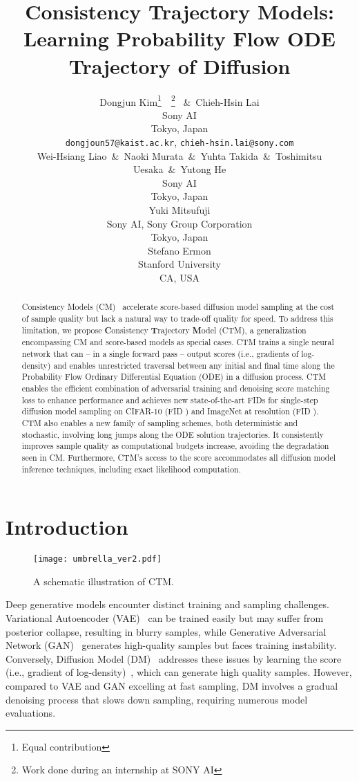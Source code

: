 \documentclass{article} \usepackage{iclr2024_coNFErence,times}
\title{Consistency Trajectory Models: Learning Probability Flow ODE Trajectory of Diffusion}
\author{Dongjun Kim\thanks{Equal contribution}~~\thanks{Work done during an internship at SONY AI} ~\&~Chieh-Hsin Lai \\
Sony AI\\
Tokyo, Japan \\
\texttt{dongjoun57@kaist.ac.kr}, \texttt{chieh-hsin.lai@sony.com} \\
\And
Wei-Hsiang Liao~\&~Naoki Murata~\&~Yuhta Takida~\&~Toshimitsu Uesaka~\&~Yutong He \\
Sony AI \\
Tokyo, Japan \\
\AND
Yuki Mitsufuji \\
Sony AI, Sony Group Corporation \\
Tokyo, Japan \\
\AND
Stefano Ermon \\
Stanford University \\
CA, USA \\
}
\theoremstyle{definition}
\theoremstyle{remark}
\begin{document}
\maketitle
\doparttoc
	\parttoc

\begin{abstract}
Consistency Models (CM)~\citep{song2023consistency}
 accelerate score-based diffusion model sampling at the cost of sample quality but lack a natural way to trade-off quality for speed. To address this limitation, we propose \textbf{C}onsistency \textbf{T}rajectory \textbf{M}odel (CTM), a generalization encompassing CM and score-based models as special cases. CTM trains a single neural network that can -- in a single forward pass -- output scores (i.e., gradients of log-density) and enables unrestricted traversal between any initial and final time along the Probability Flow Ordinary Differential Equation (ODE) in a diffusion process. CTM enables the efficient combination of adversarial training and denoising score matching loss to enhance performance and achieves new state-of-the-art FIDs for single-step diffusion model sampling on CIFAR-10 (FID ) and ImageNet at  resolution (FID ). CTM also enables a new family of sampling schemes, both deterministic and stochastic, involving long jumps along the ODE solution trajectories. It consistently improves sample quality as computational budgets increase, avoiding the degradation seen in CM. Furthermore, CTM's access to the score accommodates all diffusion model inference techniques, including exact likelihood computation.
\end{abstract}



\section{Introduction}\label{sec:intro}


\begin{wrapfigure}{r}{0.5\textwidth}
	\vskip -0.4in
	\centering
		\centering		\texttt{[image: umbrella\_ver2.pdf]}
	\caption{A schematic illustration of CTM.}
	\label{fig:umbrella}
 \vskip -0.4in
\end{wrapfigure}

Deep generative models encounter distinct training and sampling challenges. Variational Autoencoder (VAE)~\citep{kingma2013auto} can be trained easily but
 may suffer from posterior collapse, resulting in blurry samples, while Generative Adversarial Network (GAN)~\citep{goodfellow2014generative} generates high-quality samples but faces training instability. Conversely, Diffusion Model (DM)~\citep{sohl2015deep,ho2020denoising, song2020score} addresses these issues by learning the score (i.e., gradient of log-density)~\citep{song2019generative}, which can generate high quality samples.
However, compared to VAE and GAN excelling at fast sampling,  DM involves a gradual denoising process that slows down sampling, requiring numerous model evaluations.
\end{document}
